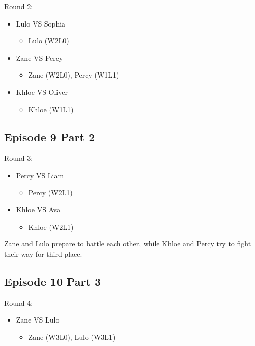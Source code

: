 \documentclass[12pt, letterpaper]{article}
\begin{document}
\par \noindent Round 2: 

\begin{itemize}
   \item Lulo VS Sophia
   \begin{itemize}
      \item Lulo (W2L0)
   \end{itemize}
   \item Zane VS Percy
   \begin{itemize}
      \item Zane (W2L0), Percy (W1L1)
   \end{itemize}
   \item Khloe VS Oliver
   \begin{itemize}
      \item Khloe (W1L1)
   \end{itemize}
\end{itemize}

\subsection*{Episode 9 Part 2}

\par \noindent Round 3:
\begin{itemize}
   \item Percy VS Liam
   \begin{itemize}
      \item Percy (W2L1)
   \end{itemize}
   \item Khloe VS Ava
   \begin{itemize}
      \item Khloe (W2L1)
   \end{itemize}
\end{itemize}

\par \noindent Zane and Lulo prepare to battle each other, while Khloe and Percy try to fight their way for third place.

\newpage

\subsection*{Episode 10 Part 3}
\par \noindent Round 4:
\begin{itemize}
   \item Zane VS Lulo
   \begin{itemize}
      \item Zane (W3L0), Lulo (W3L1)
   \end{itemize}
\end{itemize}
    
\end{document}
